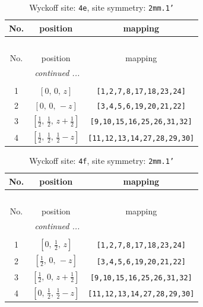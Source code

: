 \documentclass[fleqn,8pt]{jsarticle}
\begin{document}
\begin{longtable}{ccc}
\caption{Wyckoff site: {\tt 4e}, site symmetry: {\tt 2mm.1'}}
 \\
 \hline \hline
No. & position & mapping \\ \hline \endfirsthead

\multicolumn{2}{l}{\tablename\ \thetable{}} \\
 \hline \hline
No. & position & mapping \\ \hline \endhead

 \hline \hline
\multicolumn{2}{r}{\footnotesize\it continued ...} \\ \endfoot

 \hline \hline
\multicolumn{2}{r}{} \\ \endlastfoot

1 & $\left[ 0,\, 0,\, z \right]$ & {\tt [1,2,7,8,17,18,23,24]} \\ \hline
2 & $\left[ 0,\, 0,\, - z \right]$ & {\tt [3,4,5,6,19,20,21,22]} \\ \hline
3 & $\left[ \frac{1}{2},\, \frac{1}{2},\, z + \frac{1}{2} \right]$ & {\tt [9,10,15,16,25,26,31,32]} \\ \hline
4 & $\left[ \frac{1}{2},\, \frac{1}{2},\, \frac{1}{2} - z \right]$ & {\tt [11,12,13,14,27,28,29,30]} \\
\end{longtable}
\renewcommand{\arraystretch}{1.2}
\begin{longtable}{ccc}
\caption{Wyckoff site: {\tt 4f}, site symmetry: {\tt 2mm.1'}}
 \\
 \hline \hline
No. & position & mapping \\ \hline \endfirsthead

\multicolumn{2}{l}{\tablename\ \thetable{}} \\
 \hline \hline
No. & position & mapping \\ \hline \endhead

 \hline \hline
\multicolumn{2}{r}{\footnotesize\it continued ...} \\ \endfoot

 \hline \hline
\multicolumn{2}{r}{} \\ \endlastfoot

1 & $\left[ 0,\, \frac{1}{2},\, z \right]$ & {\tt [1,2,7,8,17,18,23,24]} \\ \hline
2 & $\left[ \frac{1}{2},\, 0,\, - z \right]$ & {\tt [3,4,5,6,19,20,21,22]} \\ \hline
3 & $\left[ \frac{1}{2},\, 0,\, z + \frac{1}{2} \right]$ & {\tt [9,10,15,16,25,26,31,32]} \\ \hline
4 & $\left[ 0,\, \frac{1}{2},\, \frac{1}{2} - z \right]$ & {\tt [11,12,13,14,27,28,29,30]} \\
\end{longtable}
\end{document}
